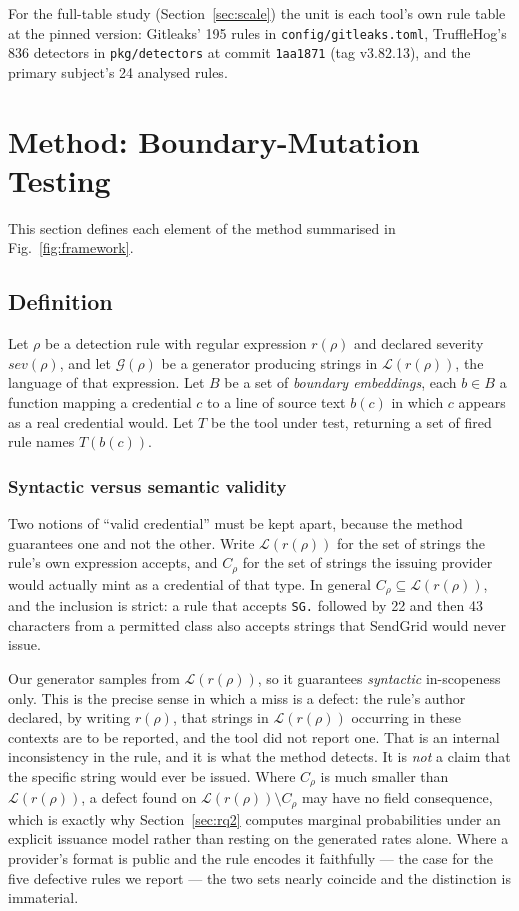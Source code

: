 \documentclass[pdflatex,sn-basic]{sn-jnl}
\begin{document}
For the full-table study (Section~\ref{sec:scale}) the unit is each tool's own rule table at the pinned version: Gitleaks' 195 rules in \texttt{config/gitleaks.toml}, TruffleHog's 836 detectors in \texttt{pkg/detectors} at commit \texttt{1aa1871} (tag v3.82.13), and the primary subject's 24 analysed rules.

\section{Method: Boundary-Mutation Testing}
\label{sec:method}

This section defines each element of the method summarised in Fig.~\ref{fig:framework}.


\subsection{Definition}

Let $\rho$ be a detection rule with regular expression $r(\rho)$ and declared severity $sev(\rho)$, and let $\mathcal{G}(\rho)$ be a generator producing strings in $\mathcal{L}(r(\rho))$, the language of that expression. Let $B$ be a set of \emph{boundary embeddings}, each $b \in B$ a function mapping a credential $c$ to a line of source text $b(c)$ in which $c$ appears as a real credential would. Let $T$ be the tool under test, returning a set of fired rule names $T(b(c))$.

\subsubsection*{Syntactic versus semantic validity}
\label{sec:validity}

Two notions of ``valid credential'' must be kept apart, because the method guarantees one and not the other. Write $\mathcal{L}(r(\rho))$ for the set of strings the rule's own expression accepts, and $C_\rho$ for the set of strings the issuing provider would actually mint as a credential of that type. In general $C_\rho \subseteq \mathcal{L}(r(\rho))$, and the inclusion is strict: a rule that accepts \texttt{SG.} followed by 22 and then 43 characters from a permitted class also accepts strings that SendGrid would never issue.

Our generator samples from $\mathcal{L}(r(\rho))$, so it guarantees \emph{syntactic} in-scope\-ness only. This is the precise sense in which a miss is a defect: the rule's author declared, by writing $r(\rho)$, that strings in $\mathcal{L}(r(\rho))$ occurring in these contexts are to be reported, and the tool did not report one. That is an internal inconsistency in the rule, and it is what the method detects. It is \emph{not} a claim that the specific string would ever be issued. Where $C_\rho$ is much smaller than $\mathcal{L}(r(\rho))$, a defect found on $\mathcal{L}(r(\rho)) \setminus C_\rho$ may have no field consequence, which is exactly why Section~\ref{sec:rq2} computes marginal probabilities under an explicit issuance model rather than resting on the generated rates alone. Where a provider's format is public and the rule encodes it faithfully --- the case for the five defective rules we report --- the two sets nearly coincide and the distinction is immaterial.
\end{document}
